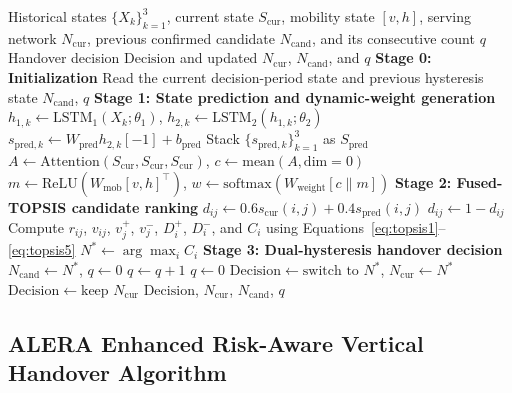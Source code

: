 \documentclass[preprint,12pt]{elsarticle}
\begin{document}
\begin{algorithm}[H]
\caption{LAAVHA vertical-handover decision procedure}
\label{alg:laavha}
\small
\begin{algorithmic}[1]
\Require Historical states $\{X_k\}_{k=1}^{3}$, current state $S_{\mathrm{cur}}$, mobility state $[v,h]$, serving network $N_{\mathrm{cur}}$, previous confirmed candidate $N_{\mathrm{cand}}$, and its consecutive count $q$
\Ensure Handover decision $\mathrm{Decision}$ and updated $N_{\mathrm{cur}}$, $N_{\mathrm{cand}}$, and $q$
\State \textbf{Stage 0: Initialization}
\State Read the current decision-period state and previous hysteresis state $N_{\mathrm{cand}}$, $q$
\State \textbf{Stage 1: State prediction and dynamic-weight generation}
 \State $h_{1,k}\gets\mathrm{LSTM}_1(X_k;\theta_1)$, $h_{2,k}\gets\mathrm{LSTM}_2(h_{1,k};\theta_2)$
 \State $s_{\mathrm{pred},k}\gets W_{\mathrm{pred}}h_{2,k}[-1]+b_{\mathrm{pred}}$
\EndFor
\State Stack $\{s_{\mathrm{pred},k}\}_{k=1}^{3}$ as $S_{\mathrm{pred}}$
\State $A\gets\mathrm{Attention}(S_{\mathrm{cur}},S_{\mathrm{cur}},S_{\mathrm{cur}})$, $c\gets\mathrm{mean}(A,\mathrm{dim}=0)$
\State $m\gets\mathrm{ReLU}(W_{\mathrm{mob}}[v,h]^\top)$, $w\gets\mathrm{softmax}(W_{\mathrm{weight}}[c\parallel m])$
\State \textbf{Stage 2: Fused-TOPSIS candidate ranking}
 \State $d_{ij}\gets0.6s_{\mathrm{cur}}(i,j)+0.4s_{\mathrm{pred}}(i,j)$
  $d_{ij}\gets1-d_{ij}$ \EndIf
 \EndFor
\EndFor
\State Compute $r_{ij}$, $v_{ij}$, $v_j^+$, $v_j^-$, $D_i^+$, $D_i^-$, and $C_i$ using Equations~\eqref{eq:topsis1}--\eqref{eq:topsis5}
\State $N^*\gets\arg\max_i C_i$
\State \textbf{Stage 3: Dual-hysteresis handover decision}
 \State $N_{\mathrm{cand}}\gets N^*$, $q\gets0$
\EndIf
{}
 \State $q\gets q+1$
\Else
 \State $q\gets0$
\EndIf
{}
 \State $\mathrm{Decision}\gets\text{switch to }N^*$, $N_{\mathrm{cur}}\gets N^*$
\Else
 \State $\mathrm{Decision}\gets\text{keep }N_{\mathrm{cur}}$
\EndIf
\State \Return $\mathrm{Decision}$, $N_{\mathrm{cur}}$, $N_{\mathrm{cand}}$, $q$
\end{algorithmic}
\end{algorithm}

\subsection{ALERA Enhanced Risk-Aware Vertical Handover Algorithm}\label{sec:alera}
\end{document}
